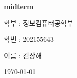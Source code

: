 \documentclass[10pt, a4paper]{article}
\newcommand\course{김상해}                            %
\newcommand\hwnumber{Data Science}                                 %
\newcommand\Information{midterm}                        %
\newcommand\majornumber{202155643} %
\newcommand\major{정보컴퓨터공학부} %
\newcommand{\tb}[1]{\textbf{#1}}
\theoremstyle{definition}
\begin{document}
\begin{titlepage}
    \begin{center}
        \vspace*{3cm}

        \Huge
        \textbf{}

        \vspace{1cm}
 	{
	 \fontsize{50}{50}
	 \selectfont {\hwnumber}}


        \vspace{1.5cm}
        \Large


        \tb{\Information}                   %


        \vfill

     \Large
        학부 : \major


        \Large
        학번 : \majornumber



        \Large
        이름 : \course


        \vspace{1cm}





        \today

    \end{center}
\end{titlepage}
\newpage
\tableofcontents
\newpage



\end{document}
